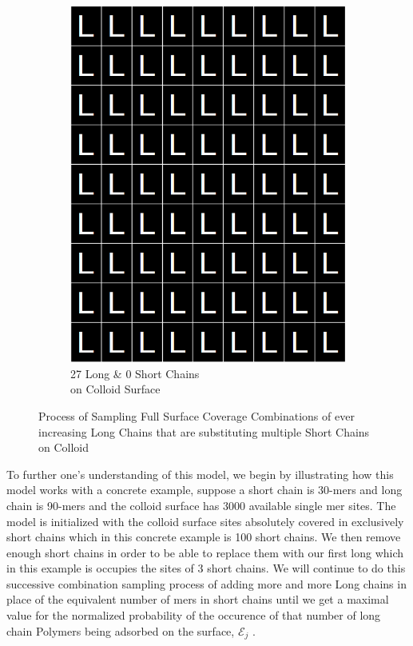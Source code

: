\documentclass[journal=jacsat,manuscript=article]{achemso}
\begin{document}
\begin{figure}[H]
\begin{subfigure}[b]{0.4\textwidth}
        \includegraphics[scale=0.15]{fig8f.png}
        \caption{27 Long \& 0 Short Chains\\ on Colloid Surface}
        \label{fig:F}
    \end{subfigure}
    \caption{Process of Sampling Full Surface Coverage Combinations of ever increasing Long Chains that are substituting multiple Short Chains  on Colloid}
\end{figure}

\newpage

To further one's understanding of this model, we begin by illustrating how this model works with a concrete example, suppose a short chain is 30-mers and long chain is 90-mers and the colloid surface has 3000 available single mer sites. The model is initialized with the colloid surface sites absolutely covered in exclusively short chains  which in this concrete example is 100 short chains. We then remove enough short chains in order to be able to replace them with our first long which in this example is occupies the sites of 3  short chains. We will continue to do this successive combination sampling process of adding more and more Long chains in place of the equivalent number of mers in short chains until we get a maximal value for the normalized probability of the occurence of that number of long chain Polymers being adsorbed on the surface, $\mathcal{E}_j$ .
\end{document}
